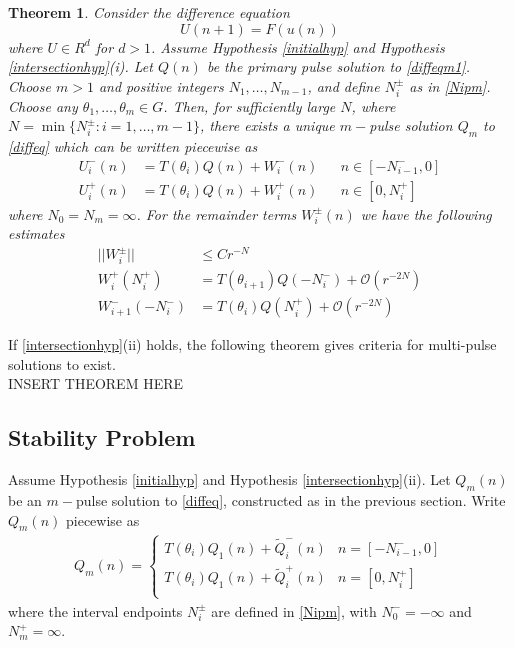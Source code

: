 \documentclass[12pt]{article}
\newtheorem{theorem}{Theorem}
\begin{document}
\begin{theorem}\label{transversemulti}
Consider the difference equation
\begin{equation}\label{diffeqm1}
U(n+1) = F(u(n))
\end{equation}
where $U \in R^d$ for $d > 1$. Assume Hypothesis \ref{initialhyp} and Hypothesis \ref{intersectionhyp}(i). Let $Q(n)$ be the primary pulse solution to \eqref{diffeqm1}. Choose $m > 1$ and positive integers $N_1, \dots, N_{m-1}$, and define $N_i^\pm$ as in \eqref{Nipm}. Choose any $\theta_1, \dots, \theta_m \in G$. Then, for sufficiently large $N$, where $N = \min\{ N_i^\pm : i = 1, \dots, m-1 \}$, there exists a unique $m-$pulse solution $Q_m$ to \eqref{diffeq} which can be written piecewise as 
\begin{align}
U_i^-(n) &= T(\theta_i) Q(n) + W_i^-(n) && n \in [-N_{i-1}^-, 0] \\
U_i^+(n) &= T(\theta_i) Q(n) + W_i^+(n) && n \in [0, N_i^+]
\end{align}
where $N_0 = N_m = \infty$. For the remainder terms $W_i^\pm(n)$ we have the following estimates
\begin{align}
||W_i^\pm|| &\leq C r^{-N} \\
W_i^+(N_i^+) &= T(\theta_{i+1}) Q(-N_i^-) + \mathcal{O}(r^{-2N}) \\
W_{i+1}^-(-N_i^-) &= T(\theta_i) Q(N_i^+) + \mathcal{O}(r^{-2N})
\end{align}
\end{theorem}

If \ref{intersectionhyp}(ii) holds, the following theorem gives criteria for multi-pulse solutions to exist.\\

INSERT THEOREM HERE

\subsection{Stability Problem}
Assume Hypothesis \ref{initialhyp} and Hypothesis \ref{intersectionhyp}(ii). Let $Q_m(n)$ be an $m-$pulse solution to \eqref{diffeq}, constructed as in the previous section. Write $Q_m(n)$ piecewise as
\begin{align}\label{qmpiecewise}
Q_m(n) =
\begin{cases}
T(\theta_i) Q_1(n) + \tilde{Q}_i^-(n) & n = [-N_{i-1}^-, 0] \\
T(\theta_i) Q_1(n) + \tilde{Q}_i^+(n) & n = [0, N_i^+] \\
\end{cases}
\end{align}
where the interval endpoints $N_i^\pm$ are defined in \eqref{Nipm}, with $N_0^- = -\infty$ and $N_m^+ = \infty$. 
\end{document}
